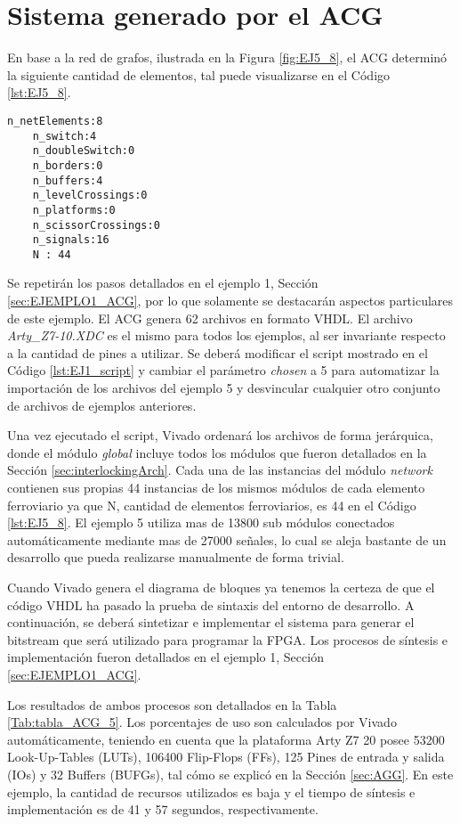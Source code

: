 \section{Sistema generado por el ACG}

	En base a la red de grafos, ilustrada en la Figura \ref{fig:EJ5_8}, el ACG determinó la siguiente cantidad de elementos, tal puede visualizarse en el Código \ref{lst:EJ5_8}.
	
	\begin{lstlisting}[language = {}, caption = Cantidad de elementos a implementar por el ACG, label = {lst:EJ5_8}]
	n_netElements:8
	n_switch:4
	n_doubleSwitch:0
	n_borders:0
	n_buffers:4
	n_levelCrossings:0
	n_platforms:0
	n_scissorCrossings:0
	n_signals:16
	N : 44
	\end{lstlisting}
	
	Se repetirán los pasos detallados en el ejemplo 1, Sección \ref{sec:EJEMPLO1_ACG}, por lo que solamente se destacarán aspectos particulares de este ejemplo. El ACG genera 62 archivos en formato VHDL. El archivo \textit{Arty\_Z7-10.XDC} es el mismo para todos los ejemplos, al ser invariante respecto a la cantidad de pines a utilizar. Se deberá modificar el script mostrado en el Código \ref{lst:EJ1_script} y cambiar el parámetro \textit{chosen} a 5 para automatizar la importación de los archivos del ejemplo 5 y desvincular cualquier otro conjunto de archivos de ejemplos anteriores.
	
	Una vez ejecutado el script, Vivado ordenará los archivos de forma jerárquica, donde el módulo \textit{global} incluye todos los módulos que fueron detallados en la Sección \ref{sec:interlockingArch}. Cada una de las instancias del módulo \textit{network} contienen sus propias 44 instancias de los mismos módulos de cada elemento ferroviario ya que N, cantidad de elementos ferroviarios, es 44 en el Código \ref{lst:EJ5_8}. El ejemplo 5 utiliza mas de 13800 sub módulos conectados automáticamente mediante mas de 27000 señales, lo cual se aleja bastante de un desarrollo que pueda realizarse manualmente de forma trivial.
	
	Cuando Vivado genera el diagrama de bloques ya tenemos la certeza de que el código VHDL ha pasado la prueba de sintaxis del entorno de desarrollo. A continuación, se deberá sintetizar e implementar el sistema para generar el bitstream que será utilizado para programar la FPGA. Los procesos de síntesis e implementación fueron detallados en el ejemplo 1, Sección \ref{sec:EJEMPLO1_ACG}.
	
	Los resultados de ambos procesos son detallados en la Tabla \ref{Tab:tabla_ACG_5}. Los porcentajes de uso son calculados por Vivado automáticamente, teniendo en cuenta que la plataforma Arty Z7 20 posee 53200 Look-Up-Tables (LUTs), 106400 Flip-Flops (FFs), 125 Pines de entrada y salida (IOs) y 32 Buffers (BUFGs), tal cómo se explicó en la Sección \ref{sec:AGG}. En este ejemplo, la cantidad de recursos utilizados es baja y el tiempo de síntesis e implementación es de 41 y 57 segundos, respectivamente.
		
